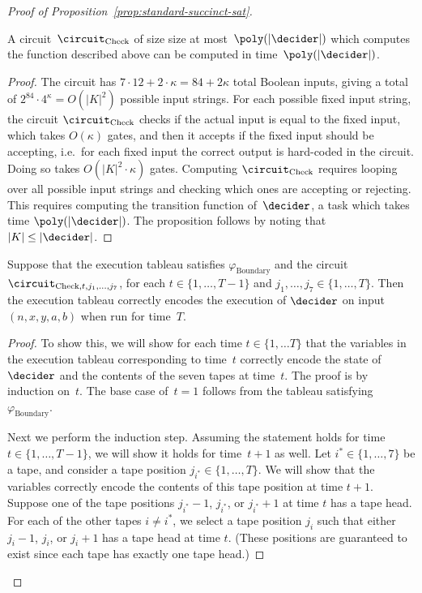 \begin{proof}[Proof of Proposition~\ref{prop:standard-succinct-sat}]
  \begin{proposition}\label{prop:check-size}
    A circuit~$\circuit_{\mathrm{Check}}$ of size size at most~$\poly(|\decider|)$ which computes the function described above can be computed in time~$\poly(|\decider|)$.
  \end{proposition}
	
  \begin{proof}
    The circuit has $7 \cdot 12 + 2\cdot \kappa = 84 + 2\kappa$ total Boolean
    inputs, giving a total of $2^{84} \cdot 4^\kappa = O(|K|^2)$ possible input
    strings.
    For each possible fixed input string, the circuit $\circuit_{\mathrm{Check}}$ checks
    if the actual input is equal to the fixed input, which takes $O(\kappa)$
    gates, and then it accepts if the fixed input should be accepting, i.e.\ for each fixed input the correct output is hard-coded in the circuit. Doing so takes $O(|K|^2 \cdot \kappa)$ gates.
    Computing $\circuit_{\mathrm{Check}}$ requires looping over all possible
    input strings and checking which ones are accepting or rejecting.
    This requires computing the transition function of~$\decider$, a task which
    takes time $\poly(|\decider|)$.
    The proposition follows by noting that $|K| \leq |\decider|$.
\end{proof}

\begin{proposition}\label{prop:correct-tableau}
  Suppose that the execution tableau satisfies $\varphi_{\mathrm{Boundary}}$ and
  the circuit $\circuit_{\mathrm{Check}, t, j_1, \ldots, j_7}$, for each $t \in
  \{1, \ldots, T-1\}$ and $j_1, \ldots, j_7 \in \{1, \ldots, T\}$.
  Then the execution tableau correctly encodes the execution of $\decider$ on
  input $(n, x,y, a, b)$ when run for time~$T$.
\end{proposition}
\begin{proof}
  To show this, we will show for each time $t \in \{1, \ldots T\}$ that the
  variables in the execution tableau corresponding to time~$t$ correctly encode
  the state of~$\decider$ and the contents of the seven tapes at time~$t$.
  The proof is by induction on~$t$.
  The base case of~$t=1$ follows from the tableau satisfying
  $\varphi_{\mathrm{Boundary}}$.

  Next we perform the induction step.
  Assuming the statement holds for time $t \in \{1, \ldots, T-1\}$, we will show
  it holds for time~$t+1$ as well.
  Let $i^* \in \{1, \ldots, 7\}$ be a tape, and consider a tape position
  $j_{i^*} \in \{1, \ldots, T\}$.
  We will show that the variables correctly encode the contents of this tape
  position at time $t+1$.
  Suppose one of the tape positions $j_{i^*}-1$, $j_{i^*}$, or $j_{i^*}+1$ at
  time $t$ has a tape head.
  For each of the other tapes $i \neq i^*$, we select a tape position $j_{i}$
  such that either $j_{i}-1$, $j_{i}$, or $j_{i}+1$ has a tape head at time $t$.
  (These positions are guaranteed to exist since each tape has exactly one tape
  head.)
  

\end{proof}
\end{proof}
